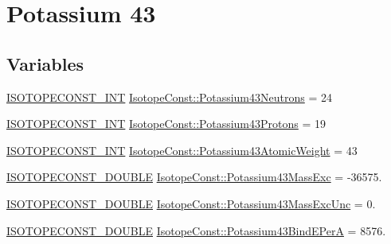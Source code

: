 \hypertarget{group___isotope_const-_potassium-_k43}{}\section{Potassium 43}
\label{group___isotope_const-_potassium-_k43}
\subsection*{Variables}
\begin{DoxyCompactItemize}
\item 
\mbox{\hyperlink{group___isotope_const-_macros_ga5f18360b3e99483a35c32d789e62621c}{I\+S\+O\+T\+O\+P\+E\+C\+O\+N\+S\+T\+\_\+\+I\+NT}} \mbox{\hyperlink{group___isotope_const-_potassium-_k43_ga7b98b9e43b6eaa2c6914d145e625d44a}{Isotope\+Const\+::\+Potassium43\+Neutrons}} = 24
\item 
\mbox{\hyperlink{group___isotope_const-_macros_ga5f18360b3e99483a35c32d789e62621c}{I\+S\+O\+T\+O\+P\+E\+C\+O\+N\+S\+T\+\_\+\+I\+NT}} \mbox{\hyperlink{group___isotope_const-_potassium-_k43_gafd488cd74ce1ce07e2b35174aa077f93}{Isotope\+Const\+::\+Potassium43\+Protons}} = 19
\item 
\mbox{\hyperlink{group___isotope_const-_macros_ga5f18360b3e99483a35c32d789e62621c}{I\+S\+O\+T\+O\+P\+E\+C\+O\+N\+S\+T\+\_\+\+I\+NT}} \mbox{\hyperlink{group___isotope_const-_potassium-_k43_gad5f6a4b2b7543a3f92912828f8ef57d9}{Isotope\+Const\+::\+Potassium43\+Atomic\+Weight}} = 43
\item 
\mbox{\hyperlink{group___isotope_const-_macros_ga8f45a7272ce02c0b4c65c44636ed719a}{I\+S\+O\+T\+O\+P\+E\+C\+O\+N\+S\+T\+\_\+\+D\+O\+U\+B\+LE}} \mbox{\hyperlink{group___isotope_const-_potassium-_k43_ga58116649969c9b31470377235f428fca}{Isotope\+Const\+::\+Potassium43\+Mass\+Exc}} = -\/36575.
\item 
\mbox{\hyperlink{group___isotope_const-_macros_ga8f45a7272ce02c0b4c65c44636ed719a}{I\+S\+O\+T\+O\+P\+E\+C\+O\+N\+S\+T\+\_\+\+D\+O\+U\+B\+LE}} \mbox{\hyperlink{group___isotope_const-_potassium-_k43_ga6735d69e1daf8d15069983519319f392}{Isotope\+Const\+::\+Potassium43\+Mass\+Exc\+Unc}} = 0.
\item 
\mbox{\hyperlink{group___isotope_const-_macros_ga8f45a7272ce02c0b4c65c44636ed719a}{I\+S\+O\+T\+O\+P\+E\+C\+O\+N\+S\+T\+\_\+\+D\+O\+U\+B\+LE}} \mbox{\hyperlink{group___isotope_const-_potassium-_k43_gad4e2a5c29caab5eb431ae55db4453f01}{Isotope\+Const\+::\+Potassium43\+Bind\+E\+PerA}} = 8576.
\item 

\end{DoxyCompactItemize}
